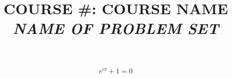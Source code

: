 \documentclass{article}
\title{COURSE \#: COURSE NAME \\ \textit{NAME OF PROBLEM SET}}
\begin{document}
\maketitle

\newproblem{
	\lipsum[1-2]
}
{
	\lipsum[3-4]

	\begin{equation}
		e^{i\pi} + 1 = 0
	\end{equation}
}
\end{document}
